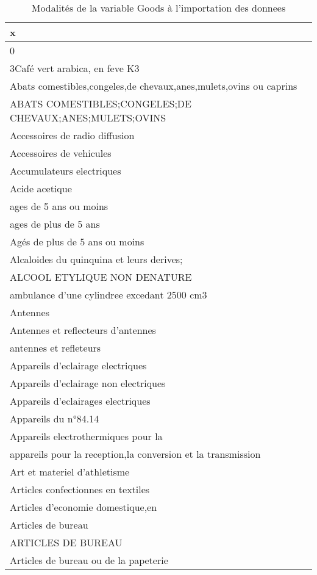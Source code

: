 \documentclass[
]{book}
\begin{document}
\begin{table}

\caption{\label{tab:g}Modalités de la variable Goods à l'importation des donnees}
\centering
\begin{tabular}[t]{l}
\hline
x\\
\hline
0\\
\hline
3Café vert arabica, en feve K3\\
\hline
Abats comestibles,congeles,de chevaux,anes,mulets,ovins ou caprins\\
\hline
ABATS COMESTIBLES;CONGELES;DE CHEVAUX;ANES;MULETS;OVINS\\
\hline
Accessoires de radio diffusion\\
\hline
Accessoires de vehicules\\
\hline
Accumulateurs electriques\\
\hline
Acide acetique\\
\hline
ages de 5 ans ou moins\\
\hline
ages de plus de 5 ans\\
\hline
Agés de plus de 5 ans ou moins\\
\hline
Alcaloides du quinquina et leurs derives;\\
\hline
ALCOOL ETYLIQUE NON DENATURE\\
\hline
ambulance d'une cylindree excedant 2500 cm3\\
\hline
Antennes\\
\hline
Antennes et reflecteurs d'antennes\\
\hline
antennes et refleteurs\\
\hline
Appareils d'eclairage electriques\\
\hline
Appareils d'eclairage non electriques\\
\hline
Appareils d'eclairages electriques\\
\hline
Appareils du n°84.14\\
\hline
Appareils electrothermiques pour la\\
\hline
appareils pour la reception,la conversion et la transmission\\
\hline
Art et materiel d'athletisme\\
\hline
Articles confectionnes en textiles\\
\hline
Articles d'economie domestique,en\\
\hline
Articles de bureau\\
\hline
ARTICLES DE BUREAU\\
\hline
Articles de bureau ou de la papeterie\\

\end{tabular}
\end{table}
\end{document}
